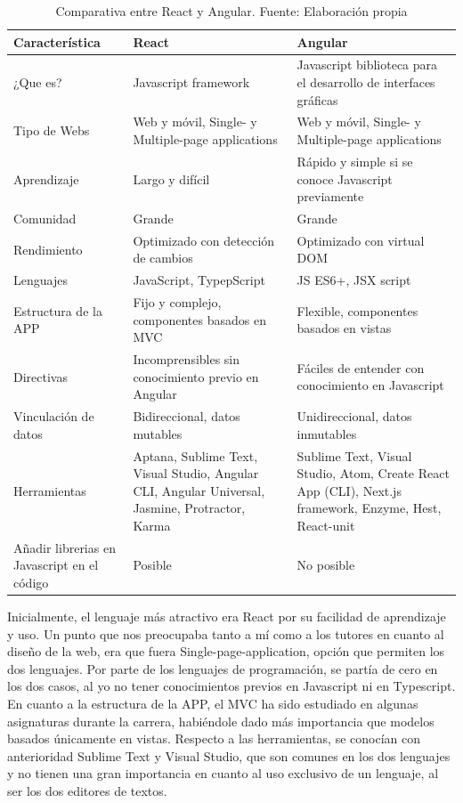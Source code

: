 \begin{table}[h]
    \centering
    \begin{tabular}{| m{2.5cm} | m{5cm} | m{5cm} |}
    \hline
        Característica & React & Angular \\ \hline
        ¿Que es? & Javascript framework & Javascript biblioteca para el desarrollo de interfaces gráficas \\ \hline
        Tipo de Webs & Web y móvil, Single- y Multiple-page applications & Web y móvil, Single- y Multiple-page  applications\\ \hline
        Aprendizaje & Largo y difícil & Rápido y simple si se conoce Javascript previamente\\ \hline
        Comunidad & Grande & Grande\\ \hline
        Rendimiento & Optimizado con detección de cambios & Optimizado con virtual DOM\\ \hline
        Lenguajes & JavaScript, TypepScript & JS ES6+, JSX script\\ \hline
        Estructura de la APP & Fijo y complejo, componentes basados en MVC & Flexible, componentes  basados en vistas\\ \hline
        Directivas & Incomprensibles sin conocimiento previo en Angular & Fáciles de entender con conocimiento en Javascript\\ \hline
        Vinculación de datos & Bidireccional, datos mutables & Unidireccional, datos  inmutables\\ \hline
        Herramientas & Aptana, Sublime Text, Visual Studio, Angular CLI, Angular Universal, Jasmine,  Protractor, Karma & Sublime Text, Visual Studio, Atom, Create React App (CLI), Next.js framework, Enzyme, Hest, React-unit\\ \hline
        Añadir librerias en Javascript en el código & Posible & No posible\\ \hline
    \end{tabular}
    \caption{Comparativa entre React y Angular. Fuente: Elaboración propia}
    \label{tab:reactvsangular}
\end{table}

\newpage

Inicialmente, el lenguaje más atractivo era React por su facilidad de aprendizaje y uso.
Un punto que nos preocupaba tanto a mí como a los tutores en cuanto al diseño de la web, era que fuera Single-page-application, opción que permiten los dos lenguajes. 
Por parte de los lenguajes de programación, se partía de cero en los dos casos, al yo no tener conocimientos previos en Javascript ni en Typescript.
En cuanto a la estructura de la APP, el MVC ha sido estudiado en algunas asignaturas durante la carrera, habiéndole dado más importancia que modelos basados únicamente en vistas.
Respecto a las herramientas, se conocían con anterioridad Sublime Text y Visual Studio, que son comunes en los dos lenguajes y no tienen una gran importancia en cuanto al uso exclusivo de un lenguaje, al ser los dos editores de textos.

